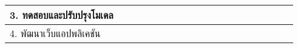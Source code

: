 \documentclass[12pt,oneside,openright,a4paper]{cpe-thai-project}
\begin{document}
\begin{table}[!h]
\begin{tabular}{|l|cccc|cccc|cccc|cccc|cc|}
3. ทดสอบและปรับปรุงโมเดล                                                        & \multicolumn{1}{c|}{}                         & \multicolumn{1}{c|}{}                         & \multicolumn{1}{c|}{}                         &                          & \multicolumn{1}{c|}{}                         & \multicolumn{1}{c|}{\cellcolor[HTML]{F89E9E}} & \multicolumn{1}{c|}{\cellcolor[HTML]{F89E9E}} & \cellcolor[HTML]{F89E9E}                        & \multicolumn{1}{c|}{\cellcolor[HTML]{F89E9E}}                        & \multicolumn{1}{c|}{}                                                & \multicolumn{1}{c|}{}                                                &                                                 & \multicolumn{1}{c|}{}                                                & \multicolumn{1}{c|}{}                                                & \multicolumn{1}{c|}{}                                                &                                                 & \multicolumn{1}{c|}{}                                                &                                                 \\ \hline
4. พัฒนาเว็บแอปพลิเคชัน                                                         & \multicolumn{1}{c|}{}                         & \multicolumn{1}{c|}{}                         & \multicolumn{1}{c|}{}                         &                          & \multicolumn{1}{c|}{}                         & \multicolumn{1}{c|}{}                         & \multicolumn{1}{c|}{{\color[HTML]{F1B97B} }}  & \cellcolor[HTML]{FFCC99}{\color[HTML]{F1B97B} } & \multicolumn{1}{c|}{\cellcolor[HTML]{FFCC99}{\color[HTML]{F1B97B} }} & \multicolumn{1}{c|}{\cellcolor[HTML]{FFCC99}{\color[HTML]{F1B97B} }} & \multicolumn{1}{c|}{\cellcolor[HTML]{FFCC99}{\color[HTML]{F1B97B} }} & {\color[HTML]{F1B97B} }                         & \multicolumn{1}{c|}{}                                                & \multicolumn{1}{c|}{}                                                & \multicolumn{1}{c|}{}                                                &                                                 & \multicolumn{1}{c|}{}                                                &                                                 \\ \hline

\end{tabular}
\end{table}
\end{document}
